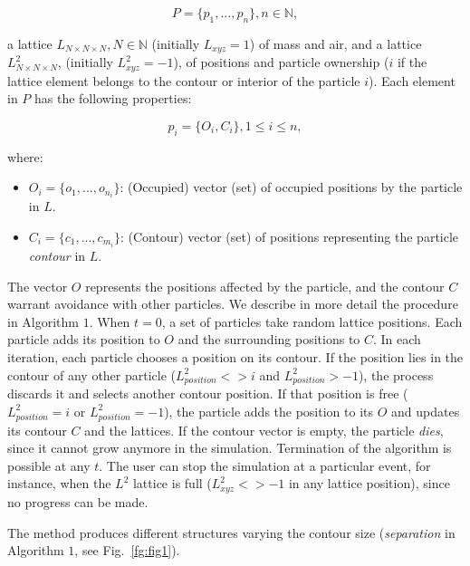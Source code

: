 \begin{equation}
  P = \{p_{1}, ... , p_{n}\}, n  \in \mathbb{N},
\end{equation}

\noindent a lattice $L_{N\times N \times N}, N \in \mathbb{N} $ (initially $L_{xyz}=1$) of mass and air, and a lattice $L^2_{N\times N \times N}$, (initially $L^2_{xyz}=-1$), of positions and particle ownership ($i$ if the lattice element belongs to the contour or interior of the particle $i$). 
Each element in $P$ has the following properties:

\begin{equation}
  p_{i} = \{O_{i}, C_{i}\}, 1 \le i \le n,
\end{equation}

\noindent where:

\begin{itemize}
\item $O_{i} = \{o_{1}, ... , o_{n_{i}}\}$: (Occupied) vector (set) of occupied positions by the particle in $L$.

\item $C_{i} = \{c_{1}, ... , c_{m_{i}}\}$: (Contour) vector (set) of positions representing the particle {\em contour} in $L$. 

\end{itemize}

The vector $O$ represents the positions affected by the particle, and the contour $C$ warrant avoidance with other particles. 
We describe in more detail the procedure in Algorithm $1$.
When $t = 0$, a set of particles take random lattice positions.
Each particle adds its position to $O$ and the surrounding positions to $C$.
In each iteration, each particle chooses a position on its contour. 
If the position lies in the contour of any other particle ($L^2_{position} <> i$ and $L^2_{position} > -1$), the process discards it and selects another contour position.
If that position is free ($L^2_{position} = i$ or $L^2_{position} = -1$), the particle adds the position to its $O$ and updates its contour $C$ and the lattices.
If the contour vector is empty, the particle {\em dies}, since it cannot grow anymore in the simulation.
Termination of the algorithm is possible at any $t$. The user can stop the simulation at a particular event, for instance, when the $L^2$ lattice is full ($L^2_{xyz} <> -1$ in any lattice position), since no progress can be made.

The method produces different structures varying the contour size ({\em separation} in Algorithm $1$, see Fig.~\ref{fg:fig1}). 

